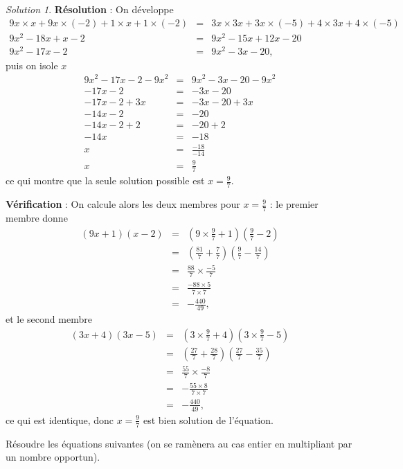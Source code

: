 \documentclass[14pt]{article}
\theoremstyle{remark}
\newtheorem*{sol}{Solution}
\newcounter{n}
\theoremstyle{plain}
\begin{document}
\begin{sol}
\textbf{Résolution} : On développe 
\begin{eqnarray*}
9x\times x +9x \times (-2) +1\times x +1\times (-2)
&=& 3x\times 3x + 3x\times(-5) + 4\times 3x +4\times(-5)\\
9x^2 -18x +x -2 &=& 9x^2 -15x +12x -20 \\
9x^2 - 17x -2 &=& 9x^2-3x -20,
\end{eqnarray*}
puis on isole $x$ 
\begin{eqnarray*}
9x^2-17x-2-9x^2 &=& 9x^2-3x-20 - 9x^2 \\
-17x-2 &=& -3x-20 \\
-17x-2 + 3x &=& -3x-20 +3x \\
-14x - 2 &=& -20 \\
-14x - 2 + 2 &=& -20 + 2 \\
-14x &=& -18 \\
x &=& \frac{-18}{-14} \\
x&=& \frac{9}7
\end{eqnarray*} ce qui montre que la seule solution possible est $x=\frac97$. 

\textbf{Vérification} : 
On calcule alors les deux membres pour $x=\frac97$ : le premier membre donne 
\begin{eqnarray*} 
(9x+1)(x-2) &=& \left(9\times\frac97+1\right)\left(\frac97-2\right)\\
&=& \left(\frac{81}7 + \frac77\right)\left(\frac97-\frac{14}7\right)\\
&=& \frac{88}7\times \frac{-5}7 \\
&=& \frac{-88\times 5}{7\times 7} \\
&=& - \frac{440}{49},
\end{eqnarray*} et le second membre 
\begin{eqnarray*}
(3x+4)(3x-5) &=& 
\left(3\times\frac97+4\right)\left(3\times\frac97-5\right)\\
&=& \left(\frac{27}7 + \frac{28}7\right)\left(\frac{27}7-\frac{35}7\right)\\
&=& \frac{55}7 \times \frac{-8}7 \\
&=& - \frac{55\times 8}{7\times 7} \\
&=& - \frac{440}{49},
\end{eqnarray*} ce qui est identique, donc $x=\frac97$ est bien solution de l'équation.\end{sol}

Résoudre les équations suivantes (on se ramènera au cas entier en multipliant par un nombre opportun).
\end{document}
